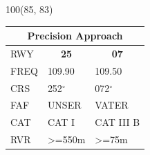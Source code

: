 \documentclass[10pt,landscape,a4paper]{article}
\begin{document}
\begin{textblock}{100}(85, 83)
\begin{table}[]
\begin{tabular}{lll}
\multicolumn{3}{c}{\textbf{Precision Approach}} \\ \hline
\multicolumn{1}{|l|}{RWY} & \multicolumn{1}{c|}{\textbf{25}} & \multicolumn{1}{c|}{\textbf{07}} \\ \hline
\multicolumn{1}{|l|}{FREQ} & \multicolumn{1}{l|}{109.90} & \multicolumn{1}{l|}{109.50} \\
\multicolumn{1}{|l|}{CRS} & \multicolumn{1}{l|}{252$^\circ$} & \multicolumn{1}{l|}{072$^\circ$}  \\
\multicolumn{1}{|l|}{FAF} & \multicolumn{1}{l|}{UNSER} & \multicolumn{1}{l|}{VATER}  \\
\multicolumn{1}{|l|}{CAT} & \multicolumn{1}{l|}{CAT I} & \multicolumn{1}{l|}{CAT III B}  \\
\multicolumn{1}{|l|}{RVR} & \multicolumn{1}{l|}{\textgreater{}=550m} & \multicolumn{1}{l|}{\textgreater{}=75m} \\ \hline
\end{tabular}
\end{table}
\end{textblock}
\end{document}
